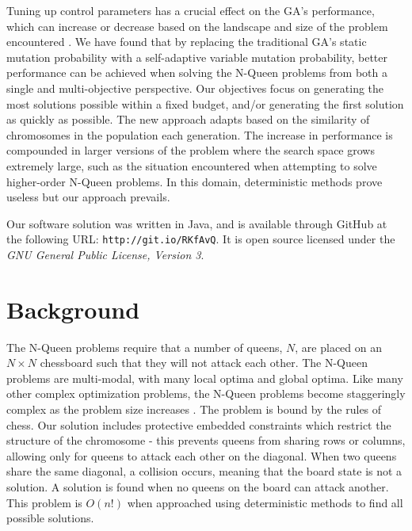\documentclass[conference]{IEEEtran}
\begin{document}
Tuning up control parameters has a crucial effect on the GA's performance, which can increase or decrease based on the landscape and size of the problem encountered \cite{cit:12,cit:13,cit:15,cit:7}. We have found that by replacing the traditional GA's static mutation probability with a self-adaptive variable mutation probability, better performance can be achieved when solving the N-Queen problems from both a single and multi-objective perspective. Our objectives focus on generating the most solutions possible within a fixed budget, and/or generating the first solution as quickly as possible. The new approach adapts based on the similarity of chromosomes in the population each generation. The increase in performance is compounded in larger versions of the problem where the search space grows extremely large, such as the situation encountered when attempting to solve higher-order N-Queen problems. In this domain, deterministic methods prove useless but our approach prevails.

Our software solution was written in Java, and is available through GitHub at the following URL: \texttt{http://git.io/RKfAvQ}. It is open source licensed under the \textit{GNU General Public License, Version 3}.

\section{Background}
The N-Queen problems require that a number of queens, $N$, are placed on an $N \times N$ chessboard such that they will not attack each other. The N-Queen problems are multi-modal, with many local optima and global optima. Like many other complex optimization problems, the N-Queen problems become staggeringly complex as the problem size increases \cite{cit:3}. The problem is bound by the rules of chess. Our solution includes protective embedded constraints which restrict the structure of the chromosome - this prevents queens from sharing rows or columns, allowing only for queens to attack each other on the diagonal. When two queens share the same diagonal, a collision occurs, meaning that the board state is not a solution. A solution is found when no queens on the board can attack another. This problem is {$O(n!)$} when approached using deterministic methods to find all possible solutions. 
\end{document}
